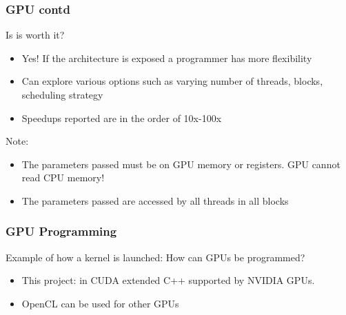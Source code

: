 \documentclass[mathserif]{beamer}
\begin{document}
\begin{frame}                                                                                                                                                                          
\frametitle{GPU contd}
Is is worth it?
\begin{itemize}
\item Yes! If the architecture is exposed a programmer has more flexibility 
\item Can explore various options such as varying number of threads, blocks, scheduling strategy 
\item Speedups reported are in the order of 10x-100x 
\end{itemize}
Note: 
\begin{itemize}
\item The parameters passed must be on GPU memory or registers. GPU cannot read CPU memory!  
\item The parameters passed are accessed by all threads in all blocks
\end{itemize} 
\end{frame}             
 

\begin{frame}                                                                                                                                                                          
\frametitle{GPU Programming}
Example of how a kernel is launched:
How can GPUs be programmed?
\begin{itemize}
\item This project: in CUDA extended C++ supported by NVIDIA GPUs.  
\item OpenCL can be used for other GPUs 
\end{itemize} 
\end{frame}             
 
\end{document}
